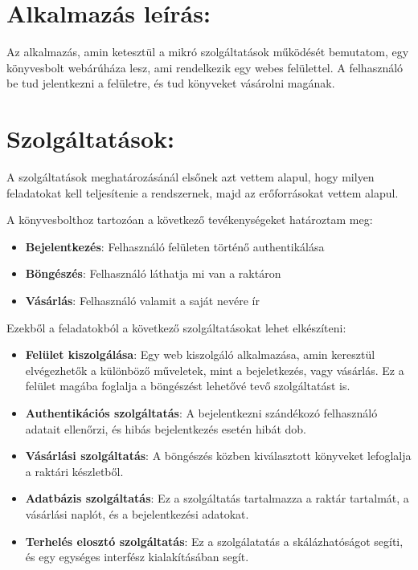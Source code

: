\documentclass[11pt,magyar,a4paper,oneside,]{report}
\begin{document}
\section{Alkalmazás leírás:}\label{alkalmazuxe1s-leuxedruxe1s}

Az alkalmazás, amin ketesztül a mikró szolgáltatások működését
bemutatom, egy könyvesbolt webárúháza lesz, ami rendelkezik egy webes
felülettel. A felhasználó be tud jelentkezni a felületre, és tud
könyveket vásárolni magának.

\section{Szolgáltatások:}\label{szolguxe1ltatuxe1sok}

A szolgáltatások meghatározásánál elsőnek azt vettem alapul, hogy milyen
feladatokat kell teljesítenie a rendszernek, majd az erőforrásokat
vettem alapul.

A könyvesbolthoz tartozóan a következő tevékenységeket határoztam meg:

\begin{itemize}
\itemsep1pt\parskip0pt
\item
  \textbf{Bejelentkezés}: Felhasználó felületen történő authentikálása
\item
  \textbf{Böngészés}: Felhasználó láthatja mi van a raktáron
\item
  \textbf{Vásárlás}: Felhasználó valamit a saját nevére ír
\end{itemize}

Ezekből a feladatokból a következő szolgáltatásokat lehet elkészíteni:

\begin{itemize}
\itemsep1pt\parskip0pt
\item
  \textbf{Felület kiszolgálása}: Egy web kiszolgáló alkalmazása, amin
  keresztül elvégezhetők a különböző műveletek, mint a bejeletkezés,
  vagy vásárlás. Ez a felület magába foglalja a böngészést lehetővé tevő
  szolgáltatást is.
\item
  \textbf{Authentikációs szolgáltatás}: A bejelentkezni szándékozó
  felhasználó adatait ellenőrzi, és hibás bejelentkezés esetén hibát
  dob.
\item
  \textbf{Vásárlási szolgáltatás}: A böngészés közben kiválasztott
  könyveket lefoglalja a raktári készletből.
\item
  \textbf{Adatbázis szolgáltatás}: Ez a szolgáltatás tartalmazza a
  raktár tartalmát, a vásárlási naplót, és a bejelentkezési adatokat.
\item
  \textbf{Terhelés elosztó szolgáltatás}: Ez a szolgálatatás a
  skálázhatóságot segíti, és egy egységes interfész kialakításában
  segít.
\end{itemize}
\end{document}
